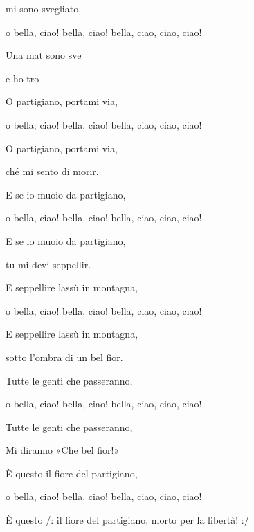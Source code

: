 

\zs
{} mi sono svegliato,

o bella, ciao! bella, ciao! bella, ciao, ciao, ciao!

Una mat sono sve

e ho tro
\ks

\zs
O partigiano, portami via,

o bella, ciao! bella, ciao! bella, ciao, ciao, ciao!

O partigiano, portami via,

ché mi sento di morir.
\ks

\zs
E se io muoio da partigiano,

o bella, ciao! bella, ciao! bella, ciao, ciao, ciao!

E se io muoio da partigiano,

tu mi devi seppellir.
\ks

\zs
E seppellire lassù in montagna,

o bella, ciao! bella, ciao! bella, ciao, ciao, ciao!

E seppellire lassù in montagna,

sotto l'ombra di un bel fior.
\ks

\zs
Tutte le genti che passeranno,

o bella, ciao! bella, ciao! bella, ciao, ciao, ciao!

Tutte le genti che passeranno,

Mi diranno «Che bel fior!»
\ks

\zs
È questo il fiore del partigiano,

o bella, ciao! bella, ciao! bella, ciao, ciao, ciao!

È questo /: il fiore del partigiano, morto per la libertà! :/

\ks

\kp


